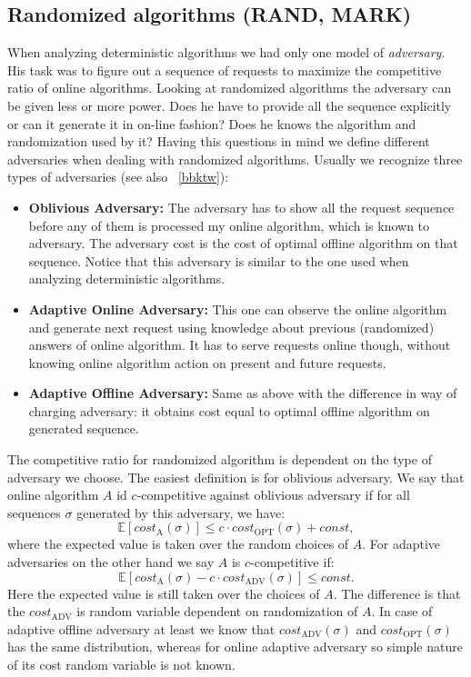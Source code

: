 \subsection{Randomized algorithms (RAND, MARK)}
When analyzing deterministic algorithms we had only one model of 
\textit{adversary}. His task was to figure out a sequence of requests to 
maximize the competitive ratio of online algorithms. Looking at randomized 
algorithms the adversary can be given less or more power. Does he have to 
provide all the sequence explicitly or can it generate it in on-line fashion? 
Does he knows the algorithm and randomization used by it? Having this questions 
in mind we define different adversaries when dealing with randomized 
algorithms. Usually we recognize three types of adversaries
(see also ~\ref{bbktw}):
\begin{itemize}
\item \textbf{Oblivious Adversary:} The adversary has to show all the request 
sequence before any of them is processed my online algorithm, which is known to 
adversary. The adversary cost is the cost of optimal offline algorithm on that 
sequence. Notice that this adversary is similar to the one used when analyzing
deterministic algorithms.
\item \textbf{Adaptive Online Adversary:} This one can observe the online 
algorithm and generate next request using knowledge about previous (randomized) 
answers of online algorithm. It has to serve requests online though, without 
knowing online algorithm action on present and future requests.
\item \textbf{Adaptive Offline Adversary:} Same as above with the difference in 
way of charging adversary: it obtains cost equal to optimal offline algorithm 
on generated sequence.
\end{itemize}
The competitive ratio for randomized algorithm is dependent on the type of 
adversary we choose. The easiest definition is for oblivious adversary. We say 
that online algorithm $A$ id $c$-competitive against oblivious adversary if for 
all sequences $\sigma$ generated by this adversary, we have:
$$\mathbb{E}[cost_{\mathrm{A}}(\sigma)] \leq c\cdot cost_{\mathrm{OPT}}(\sigma) 
+ const,$$
where the expected value is taken over the random choices of $A$. For adaptive 
adversaries on the other hand we say $A$ is $c$-competitive if:
$$\mathbb{E}[cost_{\mathrm{A}}(\sigma) - c \cdot cost_{\mathrm{ADV}}(\sigma)]
\leq const.$$
Here the expected value is still taken over the choices of $A$. The difference 
is that the $cost_{\mathrm{ADV}}$ is random variable dependent on randomization 
of $A$. 
In case of adaptive offline adversary at least we know that 
$cost_{\mathrm{ADV}}(\sigma)$ and $cost_{\mathrm{OPT}}(\sigma)$ has the same 
distribution, whereas for online 
adaptive adversary so simple nature of its cost random variable is not known.

